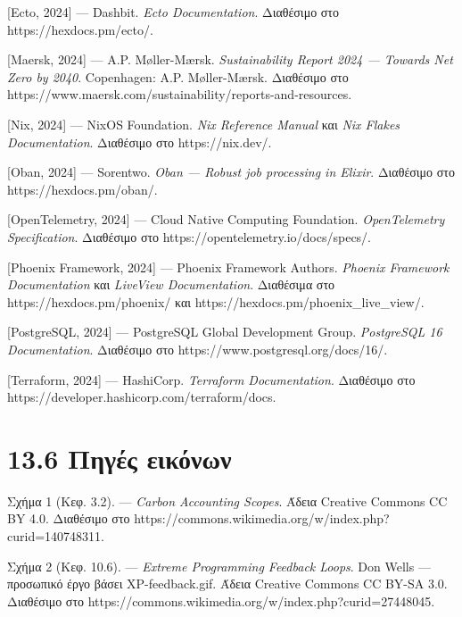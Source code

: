 \documentclass[11pt,a4paper,greek,twoside]{template-xe}
\begin{document}
{[}Ecto, 2024{]} --- Dashbit. \emph{Ecto Documentation}. Διαθέσιμο στο
https://hexdocs.pm/ecto/.

{[}Maersk, 2024{]} --- A.P. Møller-Mærsk. \emph{Sustainability Report
2024 --- Towards Net Zero by 2040}. Copenhagen: A.P. Møller-Mærsk.
Διαθέσιμο στο
https://www.maersk.com/sustainability/reports-and-resources.

{[}Nix, 2024{]} --- NixOS Foundation. \emph{Nix Reference Manual} και
\emph{Nix Flakes Documentation}. Διαθέσιμο στο https://nix.dev/.

{[}Oban, 2024{]} --- Sorentwo. \emph{Oban --- Robust job processing in
Elixir}. Διαθέσιμο στο https://hexdocs.pm/oban/.

{[}OpenTelemetry, 2024{]} --- Cloud Native Computing Foundation.
\emph{OpenTelemetry Specification}. Διαθέσιμο στο
https://opentelemetry.io/docs/specs/.

{[}Phoenix Framework, 2024{]} --- Phoenix Framework Authors.
\emph{Phoenix Framework Documentation} και \emph{LiveView
Documentation}. Διαθέσιμα στο https://hexdocs.pm/phoenix/ και
https://hexdocs.pm/phoenix\_live\_view/.

{[}PostgreSQL, 2024{]} --- PostgreSQL Global Development Group.
\emph{PostgreSQL 16 Documentation}. Διαθέσιμο στο
https://www.postgresql.org/docs/16/.

{[}Terraform, 2024{]} --- HashiCorp. \emph{Terraform Documentation}.
Διαθέσιμο στο https://developer.hashicorp.com/terraform/docs.

\section{13.6 Πηγές
εικόνων}\label{ux3c0ux3b7ux3b3ux3adux3c2-ux3b5ux3b9ux3baux3ccux3bdux3c9ux3bd}

Σχήμα 1 (Κεφ. 3.2). --- \emph{Carbon Accounting Scopes}. Άδεια Creative
Commons CC BY 4.0. Διαθέσιμο στο
https://commons.wikimedia.org/w/index.php?curid=140748311.

Σχήμα 2 (Κεφ. 10.6). --- \emph{Extreme Programming Feedback Loops}. Don
Wells --- προσωπικό έργο βάσει XP-feedback.gif. Άδεια Creative Commons
CC BY-SA 3.0. Διαθέσιμο στο
https://commons.wikimedia.org/w/index.php?curid=27448045.

\backmatter
\end{document}
